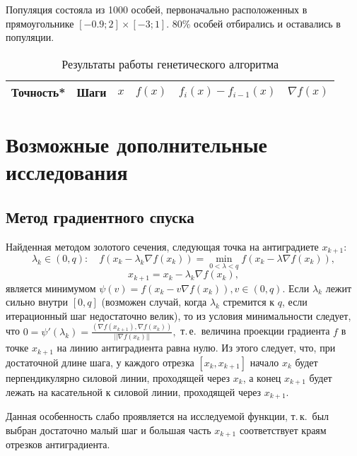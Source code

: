 \documentclass[10pt,a4paper,titlepage]{article}
\begin{document}
Популяция состояла из 1000 особей, первоначально расположенных в прямоугольнике $[-0.9; 2] \times [-3; 1].$
80\% особей отбирались и оставались в популяции.

\begin{table}[H]
\caption{Результаты работы генетического алгоритма}
\label{gen-result-table}
\begin{center}
\begin{tabular}{|c|c|c|c|c|c|}
\hline
Точность* & Шаги & $x$ & $f(x)$ & $f_i(x) - f_{i - 1}(x)$ & $\nabla f(x)$ \\
\hline

\hline
\end{tabular}
\end{center}
\end{table}

\section{Возможные дополнительные исследования}
\subsection{Метод градиентного спуска}
Найденная методом золотого сечения, следующая точка на антиградиете $x_{k+1}$:
$$
  \lambda_k \in (0, q)\!:
    \quad f(x_k - \lambda_k \nabla f(x_k)) = \min\limits_{0 < \lambda < q} f(x_k - \lambda \nabla f(x_k)),
$$
$$
  x_{k+1} = x_k - \lambda_k \nabla f(x_k),
$$
является минимумом $\psi(v) = f(x_k - v \nabla f(x_k)), v \in (0, q).$
Если $\lambda_k$ лежит сильно внутри $[0, q]$ 
(возможен случай, когда $\lambda_k$ стремится к $q$, если итерационный шаг недостаточно велик), 
то из условия минимальности следует, что 
$0 = \psi'(\lambda_k) = \frac{\left( \nabla f(x_{k+1}), \nabla f(x_{k}) \right) }{|| \nabla f(x_{k}) ||},$
т.\,е.~величина проекции градиента $f$ в точке $x_{k+1}$ на линию антиградиента равна нулю. 
Из этого следует, что, при достаточной длине шага, 
у каждого отрезка $[x_k, x_{k+1}]$ 
начало $x_k$ будет перпендикулярно силовой линии, проходящей через $x_k$, 
а конец $x_{k+1}$ будет лежать на касательной к силовой линии, проходящей через $x_{k+1}$.

Данная особенность слабо проявляется на исследуемой функции, т.\,к.~был выбран достаточно малый шаг и большая часть 
$x_{k+1}$ соответствует краям отрезков антиградиента.

\end{document}
